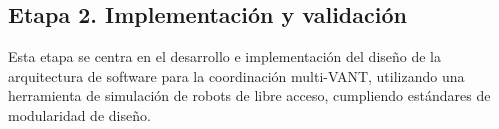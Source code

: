 \documentclass[sigconf]{acmart}
\begin{document}
  
  \subsection*{Etapa 2. Implementaci\'{o}n y validaci\'{o}n}
  
  Esta etapa se centra en el desarrollo e implementaci\'{o}n del dise\~{n}o de la arquitectura de software para la coordinaci\'{o}n multi-VANT, utilizando una herramienta de simulación de robots de libre acceso, cumpliendo estándares de modularidad de diseño.
  

  
\end{document}
